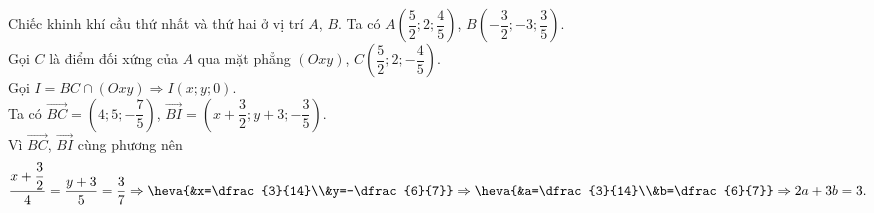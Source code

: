 \begin{ex}
{		Chiếc khinh khí cầu thứ nhất và thứ hai ở vị trí $A$, $B$. Ta có $A\left(\dfrac{5}{2};2;\dfrac{4}{5}\right)$, $B\left(-\dfrac{3}{2};-3;\dfrac{3}{5}\right)$.\\
		Gọi $C$ là điểm đối xứng của $A$ qua mặt phẳng $(Oxy)$, $C\left(\dfrac{5}{2};2;-\dfrac{4}{5}\right)$.\\ Gọi $I=BC\cap (Oxy)\Rightarrow I(x;y;0)$.\\ 
		Ta có
		$\overrightarrow{BC}=\left(4;5;-\dfrac{7}{5}\right)$, $\overrightarrow{BI}=\left(x+\dfrac{3}{2};y+3;-\dfrac{3}{5}\right)$.\\
		Vì $\overrightarrow{BC}$, $\overrightarrow{BI}$ cùng phương nên 
		$$\dfrac{x+\dfrac{3}{2}}{4}=\dfrac{y+3}{5}=\dfrac{3}{7}
		\Rightarrow\heva{&x=\dfrac{3}{14}\\&y=-\dfrac{6}{7}}
		\Rightarrow\heva{&a=\dfrac{3}{14}\\&b=\dfrac{6}{7}}
		\Rightarrow 2a+3b=3.$$
	}
\end{ex}

